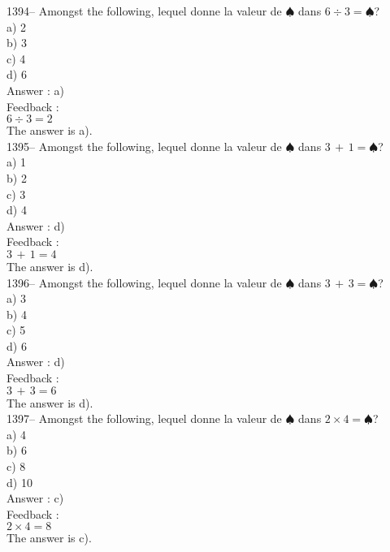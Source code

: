 \documentclass[letterpaper, 12pt]{article}
\begin{document}
1394-- Amongst the following, lequel donne la valeur de
$\spadesuit$ dans $6\div3=\spadesuit$?\\
a) 2\\
b) 3\\
c) 4\\
d) 6\\

Answer : a)\\

Feedback : \\
$6\div3=2$\\
The answer is a).\\

1395-- Amongst the following, lequel donne la valeur de
$\spadesuit$ dans $3\,+\,1=\spadesuit$?\\
a) 1\\
b) 2\\
c) 3\\
d) 4\\

Answer : d)\\

Feedback : \\
$3\,+\,1=4$\\
The answer is d).\\

1396-- Amongst the following, lequel donne la valeur de
$\spadesuit$ dans $3\,+\,3=\spadesuit$?\\
a) 3\\
b) 4\\
c) 5\\
d) 6\\

Answer : d)\\

Feedback : \\
$3\,+\,3=6$\\
The answer is d).\\

1397-- Amongst the following, lequel donne la valeur de
$\spadesuit$ dans $2\times4=\spadesuit$?\\
a) 4\\
b) 6\\
c) 8\\
d) 10\\

Answer : c)\\

Feedback : \\
$2\times4=8$\\
The answer is c).\\
\end{document}
